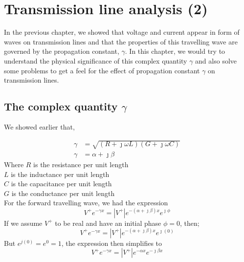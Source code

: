 \chapter{Transmission line analysis (2)}\label{lec:lec3}
In the previous chapter, we showed that voltage and current appear in form of waves on transmission lines and that the properties of this travelling wave are governed by the propagation constant, $\gamma$. In this chapter, we would try to understand the physical significance of this complex quantity $\gamma$ and also solve some problems to get a feel for the effect of propagation constant $\gamma$ on transmission lines.


\section{The complex quantity $\gamma$}We showed earlier that,

\begin{align*}
\gamma &= \sqrt{(R + \jmath\omega L)(G + \jmath\omega C)} \\
\gamma & = \alpha + \jmath\beta
\end{align*}
Where $R$ is the resistance per unit length\\

\hspace{13pt}$L$ is the inductance per unit length\\
  
\hspace{13pt}$C$ is the capacitance per unit length\\
  
\hspace{13pt}$G$ is the conductance per unit length\\ 
For the forward travelling wave, we had the expression
\begin{equation}
V^+e^{-\gamma x} =\left|  V^+\right| e^{-(\alpha + \jmath\beta)x}e^{\jmath\phi}
\end{equation}
If we assume $V^+$ to be real and have an initial phase $\phi = 0$, then;
\begin{equation*}
V^+e^{-\gamma x} = \left| V^+\right| e^{-(\alpha + \jmath\beta)x}e^{\jmath (0)}
\end{equation*}
But $ e^{j(0)} = e^0 = 1 $, the expression then simplifies to
\begin{equation}
V^+e^{-\gamma x} = \left| V^+\right| e^{-\alpha x}e^{-\jmath\beta x}
\label{eqn3.2}
\end{equation}
